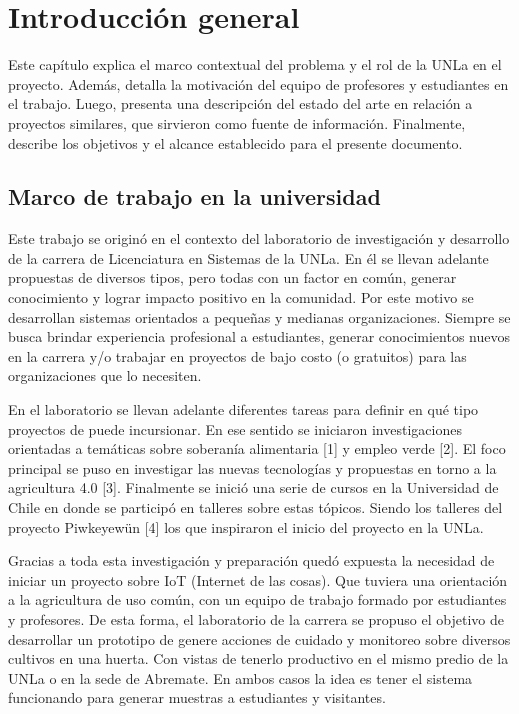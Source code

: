 \chapter{Introducción general} %

Este capítulo explica el marco contextual del problema y el rol de la UNLa en el proyecto. Además, detalla la motivación del equipo de profesores y estudiantes en el trabajo. Luego, presenta una descripción del estado del arte en relación a proyectos similares, que sirvieron como fuente de información. Finalmente, describe los objetivos y el alcance establecido para el presente documento.\\

\section{Marco de trabajo en la universidad}
Este trabajo se originó en el contexto del laboratorio de investigación y desarrollo de la carrera de Licenciatura en Sistemas de la UNLa. En él se llevan adelante propuestas de diversos tipos, pero todas con un factor en común, generar conocimiento y lograr impacto positivo en la comunidad. Por este motivo se desarrollan sistemas orientados a pequeñas y medianas organizaciones. Siempre se busca brindar experiencia profesional a estudiantes, generar conocimientos nuevos en la carrera y/o trabajar en proyectos de bajo costo (o gratuitos) para las organizaciones que lo necesiten.

En el laboratorio se llevan adelante diferentes tareas para definir en qué tipo proyectos de puede incursionar. En ese sentido se iniciaron investigaciones orientadas a temáticas sobre soberanía alimentaria [1] y empleo verde [2]. El foco principal se puso en investigar las nuevas tecnologías y propuestas en torno a la agricultura 4.0 [3]. Finalmente se inició una serie de cursos en la Universidad de Chile en donde se participó en talleres sobre estas tópicos. Siendo los talleres del proyecto Piwkeyewün [4] los que inspiraron el inicio del proyecto en la UNLa.

Gracias a toda esta investigación y preparación quedó expuesta la necesidad de iniciar un proyecto sobre IoT (Internet de las cosas). Que tuviera una orientación a la agricultura de uso común, con un equipo de trabajo formado por estudiantes y profesores. De esta forma, el laboratorio de la carrera se propuso el objetivo de desarrollar un prototipo de genere acciones de cuidado y monitoreo sobre diversos cultivos en una huerta. Con vistas de tenerlo productivo en el mismo predio de la UNLa o en la sede de Abremate. En ambos casos la idea es tener el sistema funcionando para generar muestras a estudiantes y visitantes.\\

